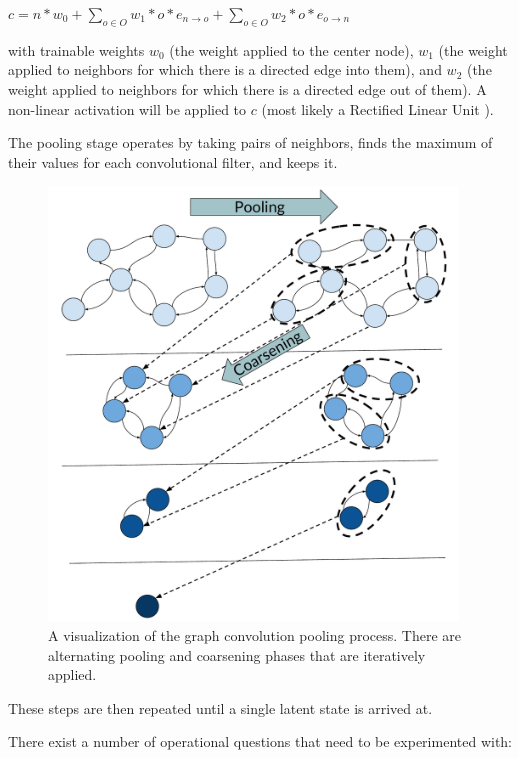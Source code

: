\documentclass[a4paper]{article}
\begin{document}
$c = n*w_0 + \sum_{o \in O} w_1*o*e_{n\rightarrow o}+ \sum_{o \in O} w_2*o*e_{o\rightarrow n}$

with trainable weights $w_0$ (the weight applied to the center node), $w_1$ (the weight applied to neighbors for which there is a directed edge into them), and $w_2$ (the weight applied to neighbors for which there is a directed edge out of them). A non-linear activation will be applied to $c$ (most likely a Rectified Linear Unit \cite{relu}).

The pooling stage operates by taking pairs of neighbors, finds the maximum of their values for each convolutional filter, and keeps it.  

\begin{figure}[htbp!]
\centering
    \includegraphics[width=0.97\textwidth]{figures/Pooling.pdf} 
   
   
    \caption{A visualization of the graph convolution pooling process. There are alternating pooling and coarsening phases that are iteratively applied.}
  \label{fig:pooling}
  \end{figure}
  
These steps are then repeated until a single latent state is arrived at.

There exist a number of operational questions that need to be experimented with:
\end{document}
